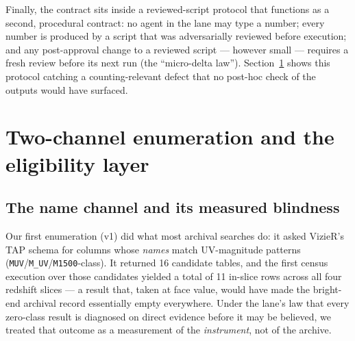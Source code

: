 \documentclass[twocolumn]{aastex702}
\begin{document}
Finally, the contract sits inside a reviewed-script protocol that functions as a second,
procedural contract: no agent in the lane may type a number; every number is produced by
a script that was adversarially reviewed before execution; and any post-approval change
to a reviewed script --- however small --- requires a fresh review before its next run
(the ``micro-delta law''). Section~\ref{sec:method} shows this protocol catching a
counting-relevant defect that no post-hoc check of the outputs would have surfaced.

\section{Two-channel enumeration and the eligibility layer} \label{sec:method}
\subsection{The name channel and its measured blindness} \label{sec:namechannel}

Our first enumeration (v1) did what most archival searches do: it asked VizieR's TAP
schema for columns whose \emph{names} match UV-magnitude patterns
(\texttt{MUV}/\texttt{M\_UV}/\texttt{M1500}-class). It returned 16 candidate tables, and
the first census execution over those candidates yielded a total of 11 in-slice rows
across all four redshift slices --- a result that, taken at face value, would have made
the bright-end archival record essentially empty everywhere. Under the lane's law that
every zero-class result is diagnosed on direct evidence before it may be believed, we
treated that outcome as a measurement of the \emph{instrument}, not of the archive.
\end{document}
